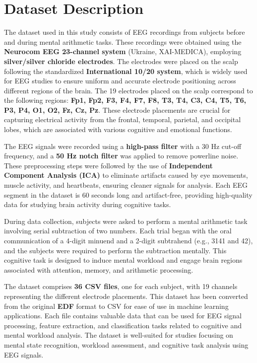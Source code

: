 \documentclass[conference]{IEEEtran}
\begin{document}
\section{Dataset Description}

The dataset used in this study consists of EEG recordings from subjects before and during mental arithmetic tasks. These recordings were obtained using the \textbf{Neurocom EEG 23-channel system} (Ukraine, XAI-MEDICA), employing \textbf{silver/silver chloride electrodes}. The electrodes were placed on the scalp following the standardized \textbf{International 10/20 system}, which is widely used for EEG studies to ensure uniform and accurate electrode positioning across different regions of the brain. The 19 electrodes placed on the scalp correspond to the following regions: \textbf{Fp1, Fp2, F3, F4, F7, F8, T3, T4, C3, C4, T5, T6, P3, P4, O1, O2, Fz, Cz, Pz}. These electrode placements are crucial for capturing electrical activity from the frontal, temporal, parietal, and occipital lobes, which are associated with various cognitive and emotional functions.

The EEG signals were recorded using a \textbf{high-pass filter} with a 30 Hz cut-off frequency, and a \textbf{50 Hz notch filter} was applied to remove powerline noise. These preprocessing steps were followed by the use of \textbf{Independent Component Analysis (ICA)} to eliminate artifacts caused by eye movements, muscle activity, and heartbeats, ensuring cleaner signals for analysis. Each EEG segment in the dataset is 60 seconds long and artifact-free, providing high-quality data for studying brain activity during cognitive tasks.

During data collection, subjects were asked to perform a mental arithmetic task involving serial subtraction of two numbers. Each trial began with the oral communication of a 4-digit minuend and a 2-digit subtrahend (e.g., 3141 and 42), and the subjects were required to perform the subtraction mentally. This cognitive task is designed to induce mental workload and engage brain regions associated with attention, memory, and arithmetic processing.

The dataset comprises \textbf{36 CSV files}, one for each subject, with 19 channels representing the different electrode placements. This dataset has been converted from the original \textbf{EDF} format to CSV for ease of use in machine learning applications. Each file contains valuable data that can be used for EEG signal processing, feature extraction, and classification tasks related to cognitive and mental workload analysis. The dataset is well-suited for studies focusing on mental state recognition, workload assessment, and cognitive task analysis using EEG signals.
\end{document}
